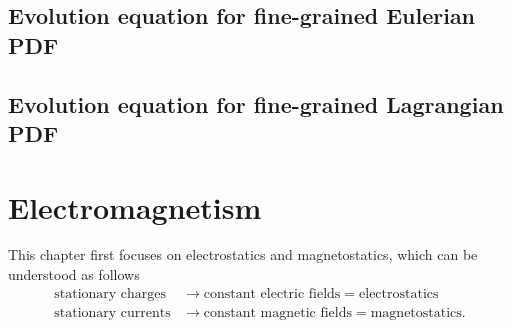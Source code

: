 \documentclass[a4paper,11pt]{report}
\begin{document}
\section{Evolution equation for fine-grained Eulerian PDF}

\section{Evolution equation for fine-grained Lagrangian PDF}

\chapter{Electromagnetism}
This chapter first focuses on electrostatics and magnetostatics, which can be understood as follows
\begin{align}
    \text{stationary charges} &\to \text{constant electric fields} = \text{electrostatics} \nonumber \\
    \text{stationary currents} &\to \text{constant magnetic fields} = \text{magnetostatics} .
\end{align}

\end{document}
